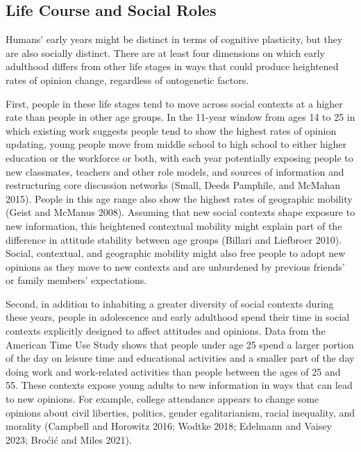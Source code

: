 \documentclass[
  12pt,
]{article}
\begin{document}
\hypertarget{life-course-and-social-roles}{%
\subsection{Life Course and Social Roles}\label{life-course-and-social-roles}}

Humans' early years might be distinct in terms of cognitive plasticity, but they are also socially distinct. There are at least four dimensions on which early adulthood differs from other life stages in ways that could produce heightened rates of opinion change, regardless of ontogenetic factors.

First, people in these life stages tend to move across social contexts at a higher rate than people in other age groups. In the 11-year window from ages 14 to 25 in which existing work suggests people tend to show the highest rates of opinion updating, young people move from middle school to high school to either higher education or the workforce or both, with each year potentially exposing people to new classmates, teachers and other role models, and sources of information and restructuring core discussion networks (Small, Deeds Pamphile, and McMahan 2015). People in this age range also show the highest rates of geographic mobility (Geist and McManus 2008). Assuming that new social contexts shape exposure to new information, this heightened contextual mobility might explain part of the difference in attitude stability between age groups (Billari and Liefbroer 2010). Social, contextual, and geographic mobility might also free people to adopt new opinions as they move to new contexts and are unburdened by previous friends' or family members' expectations.

Second, in addition to inhabiting a greater diversity of social contexts during these years, people in adolescence and early adulthood spend their time in social contexts explicitly designed to affect attitudes and opinions. Data from the American Time Use Study shows that people under age 25 spend a larger portion of the day on leisure time and educational activities and a smaller part of the day doing work and work-related activities than people between the ages of 25 and 55. These contexts expose young adults to new information in ways that can lead to new opinions. For example, college attendance appears to change some opinions about civil liberties, politics, gender egalitarianism, racial inequality, and morality (Campbell and Horowitz 2016; Wodtke 2018; Edelmann and Vaisey 2023; Broćić and Miles 2021).
\end{document}
